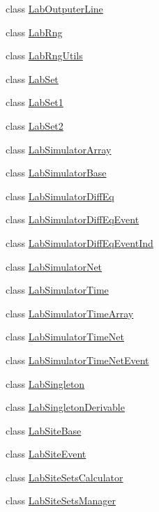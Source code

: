 \begin{DoxyCompactItemize}
\item 
class \hyperlink{classelps_1_1_lab_outputer_line}{Lab\+Outputer\+Line}
\item 
class \hyperlink{classelps_1_1_lab_rng}{Lab\+Rng}
\item 
class \hyperlink{classelps_1_1_lab_rng_utils}{Lab\+Rng\+Utils}
\item 
class \hyperlink{classelps_1_1_lab_set}{Lab\+Set}
\item 
class \hyperlink{classelps_1_1_lab_set1}{Lab\+Set1}
\item 
class \hyperlink{classelps_1_1_lab_set2}{Lab\+Set2}
\item 
class \hyperlink{classelps_1_1_lab_simulator_array}{Lab\+Simulator\+Array}
\item 
class \hyperlink{classelps_1_1_lab_simulator_base}{Lab\+Simulator\+Base}
\item 
class \hyperlink{classelps_1_1_lab_simulator_diff_eq}{Lab\+Simulator\+Diff\+Eq}
\item 
class \hyperlink{classelps_1_1_lab_simulator_diff_eq_event}{Lab\+Simulator\+Diff\+Eq\+Event}
\item 
class \hyperlink{classelps_1_1_lab_simulator_diff_eq_event_ind}{Lab\+Simulator\+Diff\+Eq\+Event\+Ind}
\item 
class \hyperlink{classelps_1_1_lab_simulator_net}{Lab\+Simulator\+Net}
\item 
class \hyperlink{classelps_1_1_lab_simulator_time}{Lab\+Simulator\+Time}
\item 
class \hyperlink{classelps_1_1_lab_simulator_time_array}{Lab\+Simulator\+Time\+Array}
\item 
class \hyperlink{classelps_1_1_lab_simulator_time_net}{Lab\+Simulator\+Time\+Net}
\item 
class \hyperlink{classelps_1_1_lab_simulator_time_net_event}{Lab\+Simulator\+Time\+Net\+Event}
\item 
class \hyperlink{classelps_1_1_lab_singleton}{Lab\+Singleton}
\item 
class \hyperlink{classelps_1_1_lab_singleton_derivable}{Lab\+Singleton\+Derivable}
\item 
class \hyperlink{classelps_1_1_lab_site_base}{Lab\+Site\+Base}
\item 
class \hyperlink{classelps_1_1_lab_site_event}{Lab\+Site\+Event}
\item 
class \hyperlink{classelps_1_1_lab_site_sets_calculator}{Lab\+Site\+Sets\+Calculator}
\item 
class \hyperlink{classelps_1_1_lab_site_sets_manager}{Lab\+Site\+Sets\+Manager}

\end{DoxyCompactItemize}
